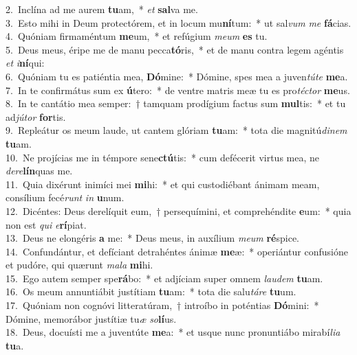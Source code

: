 {2.~}Inclína ad me aurem \textbf{tu}am,~* \textit{et} \textbf{sal}va me.\\
{3.~}Esto mihi in Deum protectórem, et in locum mu\textbf{ní}tum:~* ut sal\textit{vum} \textit{me} \textbf{fá}cias.\\
{4.~}Quóniam firmaméntum \textbf{me}um,~* et refúgium \textit{me}\textit{um} \textbf{es} tu.\\
{5.~}Deus meus, éripe me de manu pecca\textbf{tó}ris,~* et de manu contra legem agéntis \textit{et} \textit{i}\textbf{ní}qui:\\
{6.~}Quóniam tu es patiéntia mea, \textbf{Dó}mine:~* Dómine, spes mea a juven\textit{tú}\textit{te} \textbf{me}a.\\
{7.~}In te confirmátus sum ex \textbf{ú}tero:~* de ventre matris meæ tu es pro\textit{té}\textit{ctor} \textbf{me}us.\\
{8.~}In te cantátio mea semper:~† tamquam prodígium factus sum \textbf{mul}tis:~* et tu ad\textit{jú}\textit{tor} \textbf{for}tis.\\
{9.~}Repleátur os meum laude, ut cantem glóriam \textbf{tu}am:~* tota die magnitú\textit{di}\textit{nem} \textbf{tu}am.\\
{10.~}Ne projícias me in témpore sene\textbf{ctú}tis:~* cum defécerit virtus mea, ne \textit{de}\textit{re}\textbf{lín}quas me.\\
{11.~}Quia dixérunt inimíci mei \textbf{mi}hi:~* et qui custodiébant ánimam meam, consílium fecé\textit{runt} \textit{in} \textbf{u}num.\\
{12.~}Dicéntes: Deus derelíquit eum,~† persequímini, et comprehéndite \textbf{e}um:~* quia non est \textit{qui} \textit{e}\textbf{rí}piat.\\
{13.~}Deus ne elongéris \textbf{a} me:~* Deus meus, in auxílium \textit{me}\textit{um} \textbf{ré}spice.\\
{14.~}Confundántur, et defíciant detrahéntes ánimæ \textbf{me}æ:~* operiántur confusióne et pudóre, qui quærunt \textit{ma}\textit{la} \textbf{mi}hi.\\
{15.~}Ego autem semper spe\textbf{rá}bo:~* et adjíciam super omnem \textit{lau}\textit{dem} \textbf{tu}am.\\
{16.~}Os meum annuntiábit justítiam \textbf{tu}am:~* tota die salu\textit{tá}\textit{re} \textbf{tu}um.\\
{17.~}Quóniam non cognóvi litteratúram,~† introíbo in poténtias \textbf{Dó}mini:~* Dómine, memorábor justítiæ tu\textit{æ} \textit{so}\textbf{lí}us.\\
{18.~}Deus, docuísti me a juventúte \textbf{me}a:~* et usque nunc pronuntiábo mirabí\textit{li}\textit{a} \textbf{tu}a.\\
